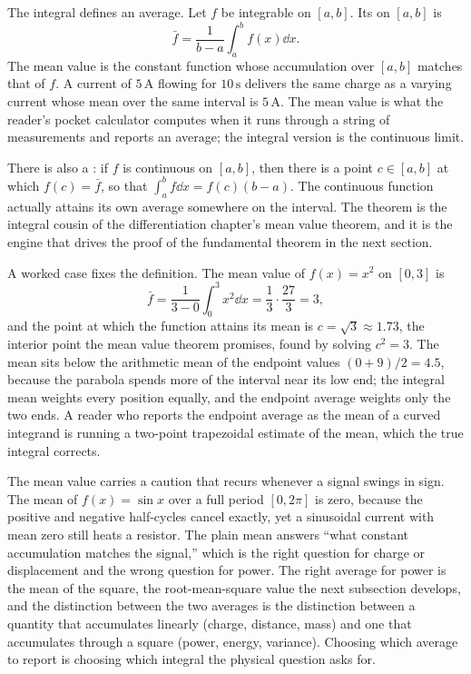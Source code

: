 The integral defines an average. Let $f$ be integrable on $[a,b]$.
Its  on $[a,b]$ is
\[
\bar{f} = \frac{1}{b-a} \int_{a}^{b} f(x) \dd x.
\]
The mean value is the constant function whose accumulation over
$[a,b]$ matches that of $f$. A current of $5\,\si{\ampere}$ flowing
for $10\,\si{\second}$ delivers the same charge as a varying current
whose mean over the same interval is $5\,\si{\ampere}$. The mean
value is what the reader's pocket calculator computes when it runs
through a string of measurements and reports an average; the
integral version is the continuous limit.

There is also a : if $f$
is continuous on $[a,b]$, then there is a point $c \in [a,b]$ at
which $f(c) = \bar{f}$, so that $\int_{a}^{b} f \dd x = f(c)(b-a)$.
The continuous function actually attains its own average somewhere
on the interval. The theorem is the integral cousin of the
differentiation chapter's mean value theorem, and it is the engine
that drives the proof of the fundamental theorem in the next
section.

A worked case fixes the definition. The mean value of $f(x) = x^{2}$ on
$[0, 3]$ is
\[
\bar{f} = \frac{1}{3 - 0}\int_{0}^{3} x^{2}\dd x = \frac{1}{3}\cdot
\frac{27}{3} = 3,
\]
and the point at which the function attains its mean is $c = \sqrt{3}
\approx 1.73$, the interior point the mean value theorem promises,
found by solving $c^{2} = 3$. The mean sits below the arithmetic mean of
the endpoint values $(0 + 9)/2 = 4.5$, because the parabola spends more
of the interval near its low end; the integral mean weights every
position equally, and the endpoint average weights only the two ends. A
reader who reports the endpoint average as the mean of a curved integrand
is running a two-point trapezoidal estimate of the mean, which the true
integral corrects.

The mean value carries a caution that recurs whenever a signal swings in
sign. The mean of $f(x) = \sin x$ over a full period $[0, 2\pi]$ is zero,
because the positive and negative half-cycles cancel exactly, yet a
sinusoidal current with mean zero still heats a resistor. The plain mean
answers ``what constant accumulation matches the signal,'' which is the
right question for charge or displacement and the wrong question for
power. The right average for power is the mean of the square, the
root-mean-square value the next subsection develops, and the distinction
between the two averages is the distinction between a quantity that
accumulates linearly (charge, distance, mass) and one that accumulates
through a square (power, energy, variance). Choosing which average to
report is choosing which integral the physical question asks for.

